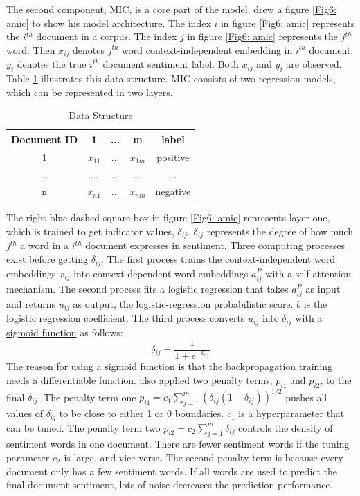 \documentclass[aoas]{imsart}
\numberwithin{equation}{section}
\theoremstyle{plain}
\theoremstyle{remark}
\begin{document}
The second component, MIC, is a core part of the model. \cite{chenyu} drew a figure \ref{Fig6: amic} to show his model architecture. The index $i$ in figure \ref{Fig6: amic} represents the $i^{th}$ document in a corpus. The index $j$ in figure \ref{Fig6: amic} represents the $j^{th}$ word. Then $x_{ij}$ denotes $j^{th}$ word context-independent embedding in $i^{th}$ document. $y_i$ denotes the true $i^{th}$ document sentiment label. Both $x_{ij}$ and $y_i$ are observed. Table \ref{tab:data} illustrates this data structure. MIC consists of two regression models, which can be represented in two layers. 
\begin{table}[ht]
    \centering
    \begin{tabular}{|c|c|c|c|c|} \hline 
         Document ID&  1&  ...&  m& label\\ \hline 
         1&  $x_{11}$&  ...&  $x_{1m}$& positive\\ \hline 
         ...&  ...&  ...&  ...& ...\\ \hline 
         n&  $x_{n1}$&  ...&  $x_{nm}$ & negative\\ \hline
    \end{tabular}
    \caption{Data Structure}
    \label{tab:data}
\end{table}

The right blue dashed square box in figure \ref{Fig6: amic} represents layer one, which is trained to get indicator values, $\delta_{ij}$. $\delta_{ij}$ represents the degree of how much $j^{th}$ a word in a $i^{th}$ document expresses in sentiment. Three computing processes exist before getting $\delta_{ij}$. The first process trains the context-independent word embeddings $x_{ij}$ into context-dependent word embeddings $a_{ij}^P$ with a self-attention mechanism. The second process fits a logistic regression that takes $a_{ij}^P$ as input and returns $u_{ij}$ as output, the logistic-regression probabilistic score. $b$ is the logistic regression coefficient. The third process converts $u_{ij}$ into $\delta_{ij}$ with a  \href{https://en.wikipedia.org/wiki/Sigmoid_function#:~:text=A%20sigmoid%20function%20is%20a,refer%20to%20the%20same%20object.}{sigmoid function} as follows: $$\delta_{ij}=\frac{1}{1+e^{-u_{ij}}}$$ The reason for using a sigmoid function is that the backpropagation training needs a differentiable function. \cite{chenyu} also applied two penalty terms, $p_{i1}$ and $p_{i2}$, to the final $\delta_{ij}$. The penalty term one $p_{i1} = c_1\sum_{j=1}^m(\delta_{ij}(1-\delta_{ij}))^{1/2}$ pushes all values of $\delta_{ij}$ to be close to either 1 or 0 boundaries. $c_1$ is a hyperparameter that can be tuned. The penalty term two $p_{i2} = c_2\sum_{j=1}^m\delta_{ij}$ controls the density of sentiment words in one document. There are fewer sentiment words if the tuning parameter $c_2$ is large, and vice versa. The second penalty term is because every document only has a few sentiment words. If all words are used to predict the final document sentiment, lots of noise decreases the prediction performance. 
\end{document}
